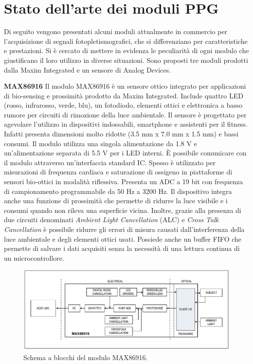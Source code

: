 \section{Stato dell'arte dei moduli PPG}
Di seguito vengono presentati alcuni moduli attualmente in commercio per l'acquisizione di segnali fotopletismografici, che si differenziano per caratteristiche e prestazioni. Si è cercato di mettere in evidenza le peculiarità di ogni modulo che giustificano il loro utilizzo in diverse situazioni. Sono proposti tre moduli prodotti dalla Maxim Integrated e un sensore di Analog Devices.

\textbf{MAX86916} Il modulo MAX86916 è un sensore ottico integrato per applicazioni di bio-sensing e prossimità prodotto da Maxim Integrated\cite{IntegratedMAX86916}. Include quattro LED (rosso, infrarosso, verde, blu), un fotodiodo, elementi ottici e elettronica a basso rumore per circuiti di rimozione della luce ambientale. Il sensore è progettato per agevolare l'utilizzo in dispositivi indossabili, smartphone e assistenti per il fitness. Infatti presenta dimensioni molto ridotte (3.5 mm x 7.0 mm x 1.5 mm) e bassi consumi. Il modulo utilizza una singola alimentazione da 1.8 V e un'alimentazione separata di 5.5 V per i LED interni. \`E possibile comunicare con il modulo attraverso un'interfaccia standard IC. Spesso è utilizzato per misurazioni di frequenza cardiaca e saturazione di ossigeno in piattaforme di sensori bio-ottici in modalità riflessiva. Presenta un ADC a 19 bit con frequenza di campionamento programmabile da 50 Hz a 3200 Hz. Il dispositivo integra anche una funzione di prossimità che permette di ridurre la luce visibile e i consumi quando non rileva una superficie vicina. Inoltre, grazie alla presenza di due circuiti denominati \textit{Ambient Light Cancellation} (ALC) e \textit{Cross Talk Cancellation} è possibile ridurre gli errori di misura causati dall'interferenza della luce ambientale e degli elementi ottici usati. Possiede anche un buffer FIFO che permette di salvare i dati acquisiti senza la necessità di una lettura continua di un microcontrollore.
\begin{figure}[h]
	\centering
	\includegraphics[width=1\linewidth]{ImageFiles/Fotopletismografia/MAX86916BlockDiagram}
	\caption{Schema a blocchi del modulo MAX86916.}
	\label{fig:MAX86916BlockDiagram}
\end{figure}

